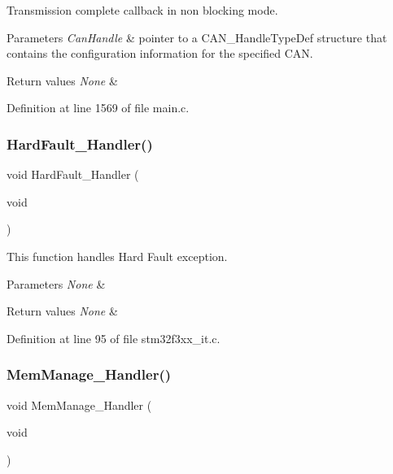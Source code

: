 Transmission complete callback in non blocking mode. 


\begin{DoxyParams}{Parameters}
{\em Can\+Handle} & pointer to a C\+A\+N\+\_\+\+Handle\+Type\+Def structure that contains the configuration information for the specified C\+AN. \\
\hline
\end{DoxyParams}

\begin{DoxyRetVals}{Return values}
{\em None} & \\
\hline
\end{DoxyRetVals}


Definition at line 1569 of file main.\+c.

\mbox{\label{group___c_a_n___networking_ga2bffc10d5bd4106753b7c30e86903bea}} 
\subsubsection{Hard\+Fault\+\_\+\+Handler()}
{\footnotesize\ttfamily void Hard\+Fault\+\_\+\+Handler (\begin{DoxyParamCaption}\item[{void}]{ }\end{DoxyParamCaption})}



This function handles Hard Fault exception. 


\begin{DoxyParams}{Parameters}
{\em None} & \\
\hline
\end{DoxyParams}

\begin{DoxyRetVals}{Return values}
{\em None} & \\
\hline
\end{DoxyRetVals}


Definition at line 95 of file stm32f3xx\+\_\+it.\+c.

\mbox{\label{group___c_a_n___networking_ga3150f74512510287a942624aa9b44cc5}} 
\subsubsection{Mem\+Manage\+\_\+\+Handler()}
{\footnotesize\ttfamily void Mem\+Manage\+\_\+\+Handler (\begin{DoxyParamCaption}\item[{void}]{ }\end{DoxyParamCaption})}




